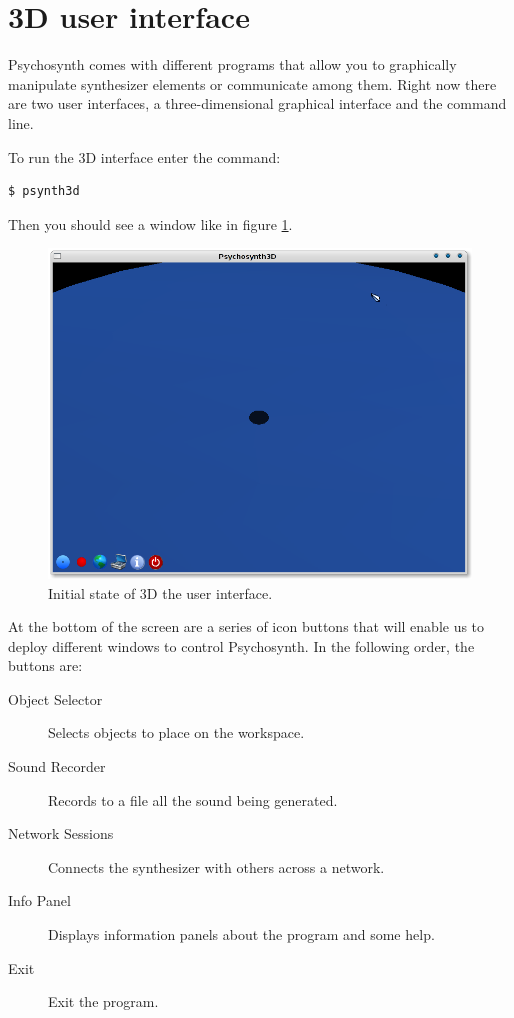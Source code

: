 \section{3D user interface}

Psychosynth comes with different programs that allow you to
graphically manipulate synthesizer elements or communicate among
them. Right now there are two user interfaces, a three-dimensional
graphical interface and the command line.

To run the 3D interface enter the command:
\begin{verbatim}
$ psynth3d
\end{verbatim}

Then you should see a window like in figure \ref{fig:userman-0}.

\begin{figure}[h!]
  \centering
  \includegraphics[width=.7\textwidth]{pic/userman-0.png}
  \caption{Initial state of 3D the user interface.}
  \label{fig:userman-0}
\end{figure}

At the bottom of the screen are a series of icon buttons that will
enable us to deploy different windows to control Psychosynth. In the
following order, the buttons are:

\begin{description}
\item[Object Selector] Selects objects to place on the workspace.
\item[Sound Recorder] Records to a file all the sound being generated.
\item[Network Sessions] Connects the synthesizer with others across a
  network.
\item[Info Panel] Displays information panels about the program and
  some help.
\item[Exit] Exit the program.
\end{description}

